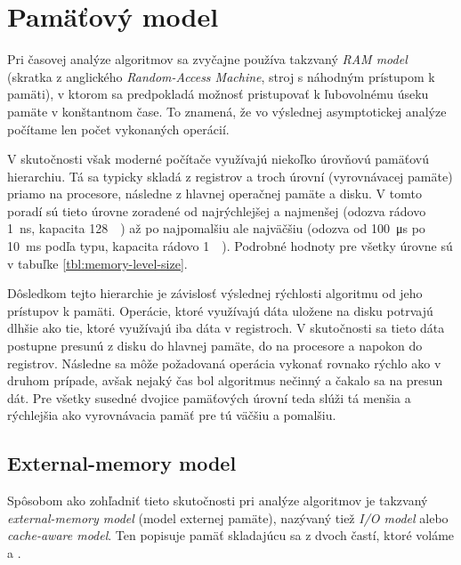 \chapter{Pamäťový model}

Pri časovej analýze algoritmov sa zvyčajne používa takzvaný \emph{RAM model} (skratka z anglického \emph{Random-Access Machine}, stroj s náhodným prístupom k pamäti), v ktorom sa predpokladá možnosť pristupovať k ľubovolnému úseku pamäte v konštantnom čase. To znamená, že vo výslednej asymptotickej analýze počítame len počet vykonaných operácií.

V skutočnosti však moderné počítače využívajú niekoľko úrovňovú pamäťovú hierarchiu. Tá sa typicky skladá z registrov a troch úrovní \cache (vyrovnávacej pamäte) priamo na procesore, následne z hlavnej operačnej pamäte a disku. V tomto poradí sú tieto úrovne zoradené od najrýchlejšej a najmenšej (odozva rádovo \SI{1}{\nano\second}, kapacita \SI{128}{\kibi\byte}) až po najpomalšiu ale najväčšiu (odozva od \SI{100}{\micro\second} po \SI{10}{\milli\second} podľa typu, kapacita rádovo \SI{1}{\tebi\byte}). Podrobné hodnoty pre všetky úrovne sú v tabuľke \ref{tbl:memory-level-size}.



Dôsledkom tejto hierarchie je závislosť výslednej rýchlosti algoritmu od jeho prístupov k pamäti. Operácie, ktoré využívajú dáta uložene na disku potrvajú dlhšie ako tie, ktoré využívajú iba dáta v registroch. V skutočnosti sa tieto dáta postupne presunú z disku do hlavnej pamäte, do \cache na procesore a napokon do registrov. Následne sa môže požadovaná operácia vykonať rovnako rýchlo ako v druhom prípade, avšak nejaký čas bol algoritmus nečinný a čakalo sa na presun dát. Pre všetky susedné dvojice pamäťových úrovní teda slúži tá menšia a rýchlejšia ako vyrovnávacia pamäť pre tú väčšiu a pomalšiu. 

\section{External-memory model}
Spôsobom ako zohľadniť tieto skutočnosti pri analýze algoritmov je takzvaný \emph{external-memory model} (model externej pamäte), nazývaný tiež \emph{I/O model} alebo \emph{cache-aware model}. Ten popisuje pamäť skladajúcu sa z dvoch častí, ktoré voláme \cache a \disk.

